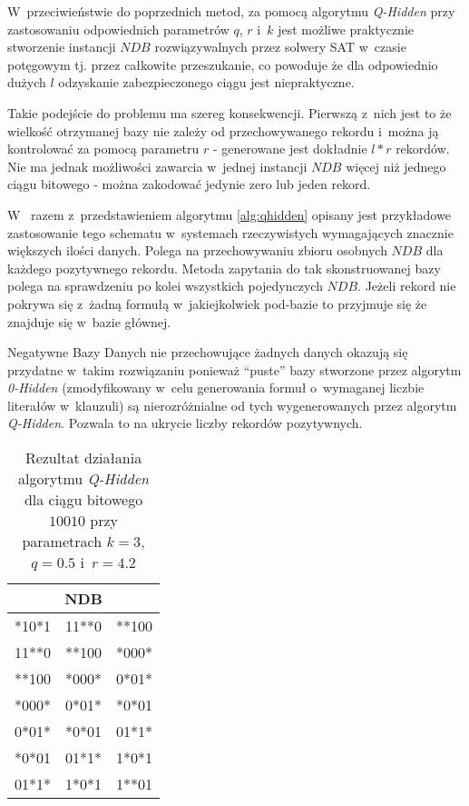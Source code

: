 W~przeciwieństwie do poprzednich metod, za pomocą algorytmu \textit{Q-Hidden} przy zastosowaniu odpowiednich
parametrów $q$, $r$ i~$k$ jest możliwe praktycznie stworzenie instancji $NDB$ rozwiązywalnych przez solwery SAT 
w~czasie potęgowym tj. przez całkowite przeszukanie, co powoduje że dla odpowiednio dużych $l$ odzyskanie 
zabezpieczonego ciągu jest niepraktyczne.

Takie podejście do problemu ma szereg konsekwencji. Pierwszą z~nich jest to że wielkość otrzymanej bazy
nie zależy od przechowywanego rekordu i~można ją kontrolować za pomocą parametru $r$ 
- generowane jest dokładnie $l * r$ rekordów. Nie ma jednak możliwości zawarcia w~jednej instancji $NDB$ 
więcej niż jednego ciągu bitowego - można zakodować jedynie zero lub jeden rekord.

W~\cite{HARD-NDB} razem z~przedstawieniem algorytmu \ref{alg:qhidden} opisany jest przykładowe zastosowanie tego schematu 
w~systemach rzeczywistych wymagających znacznie większych ilości danych. Polega na przechowywaniu zbioru osobnych $NDB$ 
dla każdego pozytywnego rekordu. Metoda zapytania do tak skonstruowanej bazy polega na sprawdzeniu po kolei wszystkich pojedynczych $NDB$.
Jeżeli rekord nie pokrywa się z~żadną formułą w~jakiejkolwiek pod-bazie to przyjmuje się że znajduje się w~bazie głównej.

Negatywne Bazy Danych nie przechowujące żadnych danych okazują się przydatne w~takim rozwiązaniu ponieważ \enquote{puste} bazy stworzone
przez algorytm \textit{0-Hidden} (zmodyfikowany w~celu generowania formuł o~wymaganej liczbie literałów w~klauzuli) są nierozróżnialne
od tych wygenerowanych przez algorytm \textit{Q-Hidden}. Pozwala to na ukrycie liczby rekordów pozytywnych.

\begin{table}[!tb]
    \centering
    \begin{tabular}{|lll|}
        \hline
        \multicolumn{3}{|c|}{NDB} \\ \hline
        *10*1 & 11**0 & **100 \\
        11**0 & **100 & *000* \\
        **100 & *000* & 0*01* \\
        *000* & 0*01* & *0*01 \\
        0*01* & *0*01 & 01*1* \\
        *0*01 & 01*1* & 1*0*1 \\
        01*1* & 1*0*1 & 1**01 \\
        \hline
    \end{tabular}
    \caption{Rezultat działania algorytmu \textit{Q-Hidden} dla ciągu bitowego $10010$ przy parametrach $k=3$, $q=0.5$ i~$r=4.2$}
    \label{tbl:qhidden_results}
\end{table}


